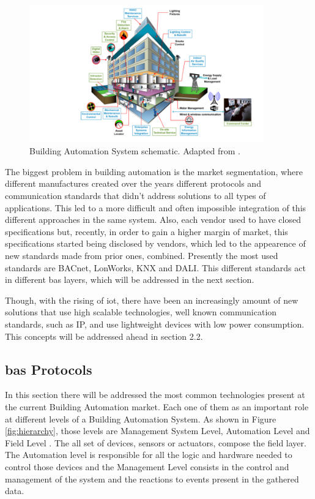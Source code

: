 \begin{figure}[H]
	\centering
	\includegraphics[width=0.9\textwidth]{figures/smart-building.jpg}
	\caption{Building Automation System schematic. Adapted from \cite{image-BAS}. }
	\label{fig:smart-building}
\end{figure}

The biggest problem in building automation is the market segmentation, where different manufactures created over the years different protocols and communication standards that didn't address solutions to all types of applications. This led to a more difficult and often impossible integration of this different approaches in the same system. Also, each vendor used to have closed specifications but, recently, in order to gain a higher margin of market, this specifications started being disclosed by vendors, which led to the appearence of new standards made from prior ones, combined. Presently the most used standards are BACnet, LonWorks, KNX and DALI. This different standards act in different \ac{bas} layers, which will be addressed in the next section. 

Though, with the rising of \ac{iot}, there have been an increasingly amount of new solutions that use high scalable technologies, well known communication standards, such as IP,  and use lightweight devices with low power consumption. This concepts will be addressed ahead in section 2.2.


\subsection{\ac{bas} Protocols}

In this section there will be addressed the most common technologies present at the current Building Automation market. Each one of them as an important role at different levels of a Building Automation System. As shown in Figure \ref{fig:hierarchy}, those levels are Management System Level, Automation Level and Field Level \cite{Iwayemi2011}. The all set of devices, sensors or actuators, compose the field layer. The Automation level is responsible for all the logic and hardware needed to control those devices and the Management Level consists in the control and management of the system and the reactions to events present in the gathered data.

